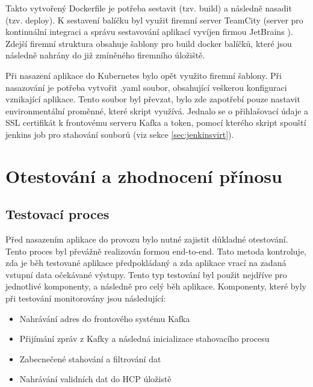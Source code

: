 \documentclass[thesis=M,czech,hidelinks]{FITthesis}[2013/05/06]
\begin{document}
Takto vytvořený Dockerfile je potřeba sestavit (tzv. build) a následně nasadit (tzv. deploy). K sestavení balíčku byl využit firemní server TeamCity (server pro kontinuální integraci a správu sestavování aplikací vyvíjen firmou JetBrains \cite{teamcity}). Zdejší firemní struktura obsahuje šablony pro build docker balíčků, které jsou následně nahrány do již zmíněného firemního úložiště.

Při nasazení aplikace do Kubernetes bylo opět využito firemní šablony. Při nasazování je potřeba vytvořit .yaml soubor, obsahující veškerou konfiguraci vznikající aplikace. Tento soubor byl převzat, bylo zde zapotřebí pouze nastavit environmentální proměnné, které skript využívá. Jednalo se o přihlašovací údaje a SSL certifikát k frontovému serveru Kafka a token, pomocí kterého skript spouští jenkins job pro stahování souborů (viz sekce \ref{sec:jenkinsvirt}).











\chapter{Otestování a zhodnocení přínosu}


\section{Testovací proces}
Před nasazením aplikace do provozu bylo nutné zajistit důkladné otestování. Tento proces byl převážně realizován formou end-to-end. Tato metoda kontroluje, zda je běh testované aplikace předpokládaný a zda aplikace vrací na zadaná vstupní data očekávané výstupy. Tento typ testování byl použit nejdříve pro jednotlivé komponenty, a následně pro celý běh aplikace. Komponenty, které byly při testování monitorovány jsou následující:
\begin{itemize}
	\item Nahrávání adres do frontového systému Kafka
	\item Přijímání zpráv z Kafky a následná inicializace stahovacího procesu
	\item Zabecnečené stahování a filtrování dat
	\item Nahrávání validních dat do HCP úložistě 
\end{itemize}
\end{document}
